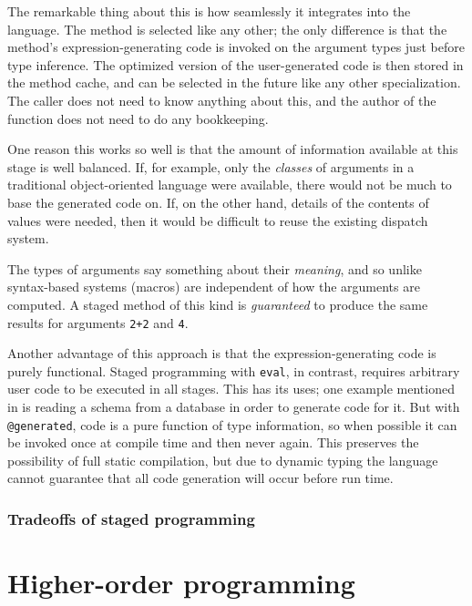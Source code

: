 The remarkable thing about this is how seamlessly it integrates into
the language.
The method is selected like any other; the only difference is that
the method's expression-generating code is invoked on the argument types
just before type inference.
The optimized version of the user-generated code is then stored in the method
cache, and can be selected in the future like any other specialization.
The caller does not need to know anything about this, and the author
of the function does not need to do any bookkeeping.

One reason this works so well is that the amount of information
available at this stage is well balanced.
If, for example, only the \emph{classes} of arguments in a traditional
object-oriented language were available, there would not be much
to base the generated code on.
If, on the other hand, details of the contents of values were needed,
then it would be difficult to reuse the existing dispatch system.

The types of arguments say something about their \emph{meaning},
and so unlike syntax-based systems (macros) are independent of how
the arguments are computed.
A staged method of this kind is \emph{guaranteed} to produce the
same results for arguments \texttt{2+2} and \texttt{4}.

Another advantage of this approach is that the expression-generating
code is purely functional.
Staged programming with \texttt{eval}, in contrast, requires arbitrary
user code to be executed in all stages.
This has its uses; one example mentioned in \cite{DeVito:2014:FRG:2594291.2594307}
is reading a schema from a database in order to generate code for it.
But with \texttt{@generated}, code is a pure function of type information,
so when possible it can be invoked once at compile time and then
never again.
This preserves the possibility of full static compilation, but due to
dynamic typing the language cannot guarantee that all code generation
will occur before run time.


\subsubsection{Tradeoffs of staged programming}


\section{Higher-order programming}

